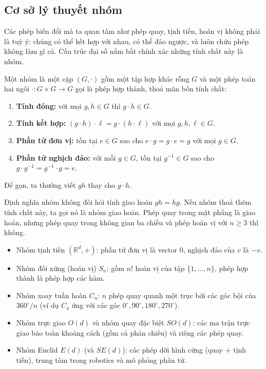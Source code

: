 \subsection{Cơ sở lý thuyết nhóm}
\label{subsec:group-theory}
 
Các phép biến đổi mà ta quan tâm như phép quay, tịnh tiến, hoán vị không phải
là tuỳ ý: chúng có thể kết hợp với nhau, có thể đảo ngược, và luôn chứa phép không làm gì cả. Cấu trúc đại số nắm bắt chính xác những tính chất này là nhóm.
 
\begin{definition}[Nhóm]
\label{def:nhom}
Một nhóm là một cặp $(G,\cdot)$ gồm một tập hợp khác rỗng $G$ và một phép toán hai ngôi
$\cdot:G\times G\to G$ gọi là phép hợp thành, thoả mãn bốn tính chất:
\begin{enumerate}[label=\textbf{(G\arabic*)}, leftmargin=2.6em, itemsep=2pt, topsep=2pt]
  \item \textbf{Tính đóng:} với mọi $g,h\in G$ thì $g\cdot h\in G$.
  \item \textbf{Tính kết hợp:}
        $(g\cdot h)\cdot \ell = g\cdot(h\cdot \ell)$ với mọi $g,h,\ell\in G$.
  \item \textbf{Phần tử đơn vị:} tồn tại $e\in G$ sao cho
        $e\cdot g = g\cdot e = g$ với mọi $g\in G$.
  \item \textbf{Phần tử nghịch đảo:} với mỗi $g\in G$, tồn tại
        $g^{-1}\in G$ sao cho $g\cdot g^{-1}=g^{-1}\cdot g = e$.
\end{enumerate}
Để gọn, ta thường viết $gh$ thay cho $g\cdot h$.
\end{definition}
 
\begin{remark}
Định nghĩa nhóm không đòi hỏi tính giao hoán $gh=hg$. Nếu nhóm thoả thêm
tính chất này, ta gọi nó là nhóm giao hoán. Phép quay trong mặt phẳng là giao hoán, nhưng phép quay trong không gian ba chiều và phép
hoán vị với $n\ge 3$ thì không.
\end{remark}
 
\begin{example}
\label{vd:cac-nhom}
\leavevmode
\begin{itemize}[leftmargin=1.4em, itemsep=2pt, topsep=2pt]
  \item Nhóm tịnh tiến $(\mathbb{R}^{d},+)$: phần tử đơn vị là vector $0$, nghịch
  đảo của $v$ là $-v$.
  \item Nhóm đối xứng (hoán vị) $S_{n}$: gồm $n!$ hoán vị của tập
  $\{1,\dots,n\}$, phép hợp thành là phép hợp các hàm.
  \item Nhóm xoay tuần hoàn $C_{n}$: $n$ phép quay quanh một trục bởi các góc bội
  của $360^{\circ}/n$ (ví dụ $C_{4}$ ứng với các góc
  $0^{\circ},90^{\circ},180^{\circ},270^{\circ}$).
  \item Nhóm trực giao $O(d)$ và nhóm quay đặc biệt $SO(d)$: các ma trận trực
  giao bảo toàn khoảng cách (gồm cả phản chiếu) và riêng các phép quay.
  \item Nhóm Euclid $E(d)$ (và $SE(d)$): các phép dời hình cứng (quay $+$ tịnh
  tiến), trung tâm trong robotics và mô phỏng phân tử.
\end{itemize}
\end{example}
 

